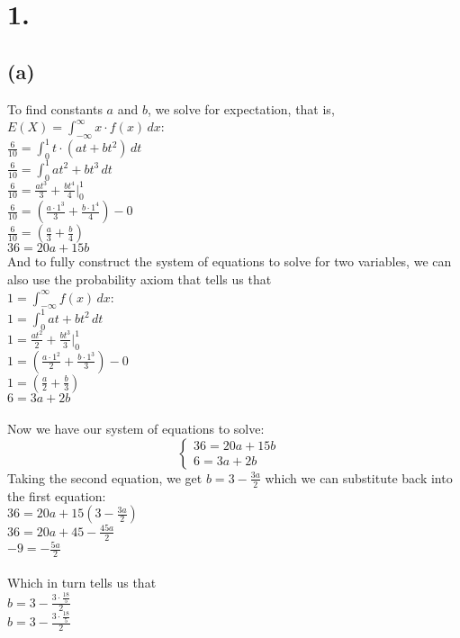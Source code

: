 \documentclass{article}
\begin{document}
\thispagestyle{firstpageheader}

\section*{1.}
{\Large 

\subsection*{(a)}
To find constants $a$ and $b$, we solve for expectation, that is, \\
$E(X) = \int_{-\infty}^{\infty} x \cdot f(x) \, dx $: \\ 
$\frac{6}{10} = \int_{0}^{1} t \cdot (at + bt^2) \, dt$ \\
$\frac{6}{10} = \int_{0}^{1} at^2 + bt^3 \, dt$ \\
$\frac{6}{10} = \frac{at^3}{3} + \frac{bt^4}{4} |_{0}^{1}$ \\
$\frac{6}{10} = (\frac{a \cdot 1^3}{3} + \frac{b \cdot 1^4}{4}) - 0$ \\
$\frac{6}{10} = (\frac{a}{3} + \frac{b}{4})$ \\
$36 = 20a + 15b$ \\
And to fully construct the system of equations to solve for two variables, we can also use the probability axiom that tells us that \\
$1 = \int_{-\infty}^{\infty} f(x) \, dx $: \\ 
$1 = \int_{0}^{1} at + bt^2 \, dt$ \\
$1 = \frac{at^2}{2} + \frac{bt^3}{3} |_{0}^{1}$ \\
$1 = (\frac{a \cdot 1^2}{2} + \frac{b \cdot 1^3}{3}) - 0$ \\
$1 = (\frac{a}{2} + \frac{b}{3})$ \\
$6 = 3a + 2b$ \\ \\ 
Now we have our system of equations to solve:
\[\begin{cases}
36 = 20a + 15b&\\
6 = 3a + 2b& 
\end{cases}\]
Taking the second equation, we get $b = 3 - \frac{3a}{2}$ which we can substitute back into the first equation: \\ 
$36 = 20a + 15(3 - \frac{3a}{2})$ \\
$36 = 20a + 45 - \frac{45a}{2}$ \\
$-9 = - \frac{5a}{2}$ \\
 \\ 
Which in turn tells us that \\ 
$b = 3 - \frac{3 \cdot \frac{18}{5}}{2}$ \\ 
$b = 3 - \frac{3 \cdot \frac{18}{5}}{2}$ \\ 

}
\end{document}
